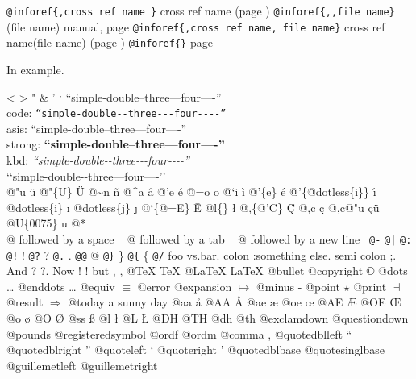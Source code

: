 \documentclass{book}
\begin{document}
\texttt{@inforef\{,cross ref name \}} cross ref name (page \pageref{anchor:})
\texttt{@inforef\{,,file name\}} (file name) manual, page \pageref{anchor:}
\texttt{@inforef\{,cross ref name, file name\}} cross ref name(file name) (page \pageref{anchor:})
\texttt{@inforef\{\}} page \pageref{anchor:}


In example.


<
>
"
\&
'
`
``simple-double--three---four----''\leavevmode{}\\
code: \texttt{``simple-double{-}{-}three{-}{-}{-}four{-}{-}{-}-''} \leavevmode{}\\
asis: ``simple-double--three---four----'' \leavevmode{}\\
strong: \textbf{``simple-double--three---four----''} \leavevmode{}\\
kbd: {\ttfamily\textsl{``simple-double{-}{-}three{-}{-}{-}four{-}{-}{-}-''}} \leavevmode{}\\
`\hbox{}`simple-double-\hbox{}-three---four----'\hbox{}'\leavevmode{}\\
@"u \"{u} 
@"\{U\} \"{U} 
@\~{}n \~{n}
@\^{}a \^{a}
@'e \'{e}
@=o \={o}
@`i \`{i}
@'\{e\} \'{e}
@'\{@dotless\{i\}\} \'{\i{}} 
@dotless\{i\} \i{}
@dotless\{j\} \j{}
@`\{@=E\} \`{\={E}} 
@l\{\} \l{}
@,\{@'C\} \c{\'{C}}
@,c \c{c}
@,c@"u \c{c}\"{u} \leavevmode{}\\
@U\{0075\} u
@* \leavevmode{}\\
@ followed by a space
\ {}
@ followed by a tab
\ {}
@ followed by a new line
\ {}\texttt{@-} \-{}
\texttt{@|} 
\texttt{@:} \@
\texttt{@!} \@!
\texttt{@?} \@?
\texttt{@.} \@.
\texttt{@@} @
\texttt{@\}} \}
\texttt{@\{} \{
\texttt{@/} 
foo vs.\@ bar. 
colon :\@And something else.
semi colon ;\@.
And ? ?\@.
Now ! !\@@
but , ,\@
@TeX \TeX{}
@LaTeX \LaTeX{}
@bullet \textbullet{}
@copyright \copyright{}
@dots \dots{}\@
@enddots \dots{}
@equiv $\equiv{}$
@error 
@expansion $\mapsto{}$
@minus -
@point $\star{}$
@print $\dashv{}$
@result $\Rightarrow{}$
@today a sunny day
@aa \aa{}
@AA \AA{}
@ae \ae{}
@oe \oe{}
@AE \AE{}
@OE \OE{}
@o \o{}
@O \O{}
@ss \ss{}
@l \l{}
@L \L{}
@DH \DH{}
@TH \TH{}
@dh \dh{}
@th \th{}
@exclamdown \textexclamdown{}
@questiondown \textquestiondown{}
@pounds \textsterling{}
@registeredsymbol \circledR{}
@ordf \textordfeminine{}
@ordm \textordmasculine{}
@comma ,
@quotedblleft \textquotedblleft{}
@quotedblright \textquotedblright{}
@quoteleft \textquoteleft{}
@quoteright \textquoteright{}
@quotedblbase \quotedblbase{}
@quotesinglbase \quotesinglbase{}
@guillemetleft \guillemotleft{}
@guillemetright \guillemotright{}
\end{document}
